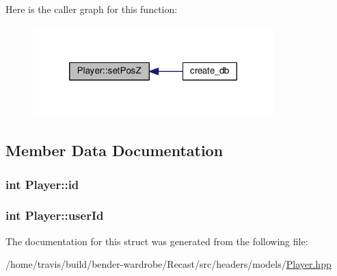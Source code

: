 Here is the caller graph for this function\-:
\nopagebreak
\begin{figure}[H]
\begin{center}
\leavevmode
\includegraphics[width=264pt]{struct_player_a265ea0b3d9627fb6f9e65dfb3aed66f7_icgraph}
\end{center}
\end{figure}




\subsection{Member Data Documentation}
\hypertarget{struct_player_a05e05f3a23de78da7ec032ec2bcf8c6c}{
\subsubsection[{id}]{\setlength{\rightskip}{0pt plus 5cm}int Player\-::id}}\label{struct_player_a05e05f3a23de78da7ec032ec2bcf8c6c}
\hypertarget{struct_player_a5c801c5fa6666baddd65a2863cc6e7f2}{
\subsubsection[{user\-Id}]{\setlength{\rightskip}{0pt plus 5cm}int Player\-::user\-Id}}\label{struct_player_a5c801c5fa6666baddd65a2863cc6e7f2}


The documentation for this struct was generated from the following file\-:\begin{DoxyCompactItemize}
\item 
/home/travis/build/bender-\/wardrobe/\-Recast/src/headers/models/\hyperlink{_player_8hpp}{Player.\-hpp}\end{DoxyCompactItemize}
